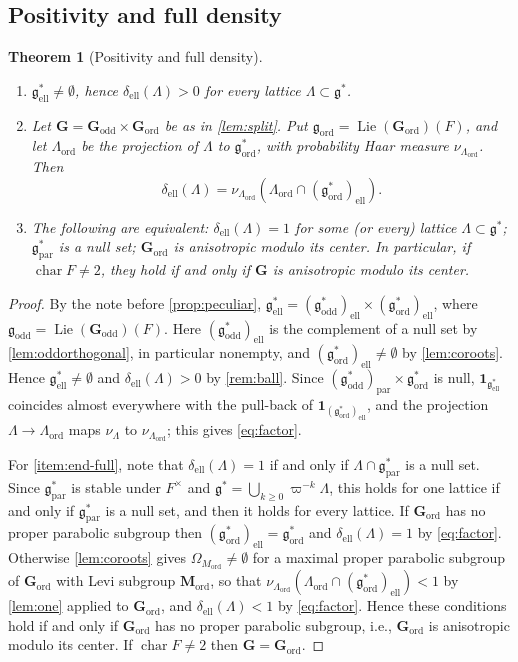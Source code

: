 \documentclass[11pt,reqno]{amsart}
\numberwithin{equation}{section}
\theoremstyle{plain}
\newtheorem{theorem}{Theorem}[section]
\theoremstyle{definition}
\theoremstyle{remark}
\theoremstyle{plain}
\newcommand{\Lat}{\mathcal{L}}   %
\newcommand{\dLat}{\Lambda}      %
\newcommand{\bG}{\mathbf{G}}     %
\newcommand{\bM}{\mathbf{M}}     %
\newcommand{\Godd}{\bG_{\mathrm{odd}}}
\newcommand{\Gord}{\bG_{\mathrm{ord}}}
\newcommand{\godd}{\g_{\mathrm{odd}}}
\newcommand{\gord}{\g_{\mathrm{ord}}}
\newcommand{\g}{\mathfrak{g}}    %
\newcommand{\gd}{\mathfrak{g}^*} %
\newcommand{\Ell}[2][]{#2_{#1\mathrm{ell}}}   %
\newcommand{\Par}[2][]{#2_{#1\mathrm{par}}}
\newcommand{\elld}[2][]{\delta_{\mathrm{ell}}^{#1}(#2)}  %
\newcommand{\one}{\mathbf{1}}
\DeclareMathOperator{\Lie}{Lie}
\DeclareMathOperator{\chr}{char}   %
\begin{document}
\subsection{Positivity and full density}

\begin{theorem}[Positivity and full density]\label{thm:endpoint}
\begin{enumerate}[label=\textup{(\arabic*)},ref=\arabic*]
\item\label{item:end-pos} $\Ell{\gd}\ne\emptyset$, hence $\elld{\dLat}>0$ for every lattice
$\dLat\subset\gd$.
\item\label{item:end-factor} Let $\bG=\Godd\times\Gord$ be as in \cref{lem:split}. Put $\gord=\Lie(\Gord)(F)$, and let
$\dLat_{\mathrm{ord}}$ be the projection of $\dLat$ to $\gord^*$, with probability Haar measure
$\nu_{\dLat_{\mathrm{ord}}}$. Then
\begin{equation}\label{eq:factor}
\elld{\dLat}=\nu_{\dLat_{\mathrm{ord}}}(\dLat_{\mathrm{ord}}\cap\Ell{(\gord^*)}).
\end{equation}
\item\label{item:end-full} The following are equivalent: $\elld{\dLat}=1$ for some (or every) lattice
$\dLat\subset\gd$; $\Par{\gd}$ is a null set; $\Gord$ is anisotropic modulo its center.
In particular, if $\chr F\ne2$, they hold if and only if $\bG$ is anisotropic modulo its center.
\end{enumerate}
\end{theorem}

\begin{proof}
By the note before \cref{prop:peculiar},
$\Ell{\gd}=\Ell{(\godd^*)}\times\Ell{(\gord^*)}$, where
$\godd=\Lie(\Godd)(F)$. Here $\Ell{(\godd^*)}$ is the
complement of a null set by \cref{lem:oddorthogonal}, in particular
nonempty, and $\Ell{(\gord^*)}\ne\emptyset$ by \cref{lem:coroots}. Hence
$\Ell{\gd}\ne\emptyset$ and $\elld{\dLat}>0$ by \cref{rem:ball}. Since
$\Par{(\godd^*)}\times\gord^*$ is null, $\one_{\Ell{\gd}}$ coincides almost everywhere
with the pull-back of $\one_{\Ell{(\gord^*)}}$, and the projection $\dLat\to \dLat_{\mathrm{ord}}$
maps $\nu_{\dLat}$ to $\nu_{\dLat_{\mathrm{ord}}}$; this gives \eqref{eq:factor}.

For \cref{item:end-full}, note that $\elld{\dLat}=1$ if and only if
$\dLat\cap\Par{\gd}$ is a null set. Since $\Par{\gd}$ is stable under
$F^\times$ and $\gd=\bigcup_{k\ge0}\varpi^{-k}\dLat$, this holds for one
lattice if and only if $\Par{\gd}$ is a null set, and then it holds for
every lattice. If $\Gord$ has no proper parabolic subgroup then
$\Ell{(\gord^*)}=\gord^*$ and $\elld{\dLat}=1$ by \eqref{eq:factor}.
Otherwise \cref{lem:coroots} gives $\Omega_{M_{\mathrm{ord}}}\ne\emptyset$ for a
maximal proper parabolic subgroup of $\Gord$ with Levi subgroup
$\bM_{\mathrm{ord}}$, so that
$\nu_{\dLat_{\mathrm{ord}}}(\dLat_{\mathrm{ord}}\cap\Ell{(\gord^*)})<1$ by
\cref{lem:one} applied to $\Gord$, and $\elld{\dLat}<1$ by
\eqref{eq:factor}. Hence these conditions hold if and only if $\Gord$ has no
proper parabolic subgroup, i.e., $\Gord$ is anisotropic modulo its
center. If $\chr F\ne2$ then $\bG=\Gord$.
\end{proof}
\end{document}
